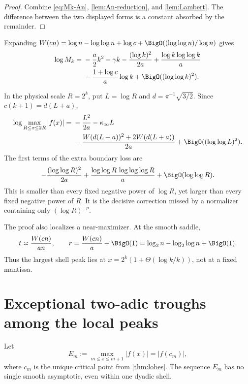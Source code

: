 \documentclass[11pt,oneside]{article}
\theoremstyle{definition}
\theoremstyle{remark}
\newcommand{\LambertW}{W}
\begin{document}
\begin{proof}
Combine \eqref{eq:Mk-An}, \cref{lem:An-reduction}, and
\cref{lem:Lambert}.  The difference between the two displayed forms is a
constant absorbed by the remainder.
\end{proof}

Expanding
$\LambertW(cn)=\log n-\log\log n+\log c+\BigO((\log\log n)/\log n)$ gives
\begin{align}
 \log M_k={}&-\frac a2k^2-\gamma k
 -\frac{(\log k)^2}{2a}
 +\frac{\log k\log\log k}{a}
 \notag\\
 &-\frac{1+\log c}{a}\log k
 +\BigO((\log\log k)^2).
 \label{eq:annular-expanded}
\end{align}

In the physical scale $R=2^k$, put $L=\log R$ and
$d=\pi^{-1}\sqrt{3/2}$.  Since $c(k+1)=d(L+a)$,
\begin{equation}
 \begin{split}
 \log\max_{R\le x\le2R}|f(x)|
 ={}&-\frac{L^2}{2a}-\kappa_\infty L\\
 &-\frac{\LambertW(d(L+a))^2+2\LambertW(d(L+a))}{2a}
 +\BigO((\log\log L)^2).
 \end{split}
 \label{eq:annular-R}
\end{equation}
The first terms of the extra boundary loss are
\begin{equation}
 -\frac{(\log\log R)^2}{2a}
 +\frac{\log\log R\,\log\log\log R}{a}
 +\BigO(\log\log R).
 \label{eq:second-lognormal}
\end{equation}
This is smaller than every fixed negative power of $\log R$, yet larger than
every fixed negative power of $R$.  It is the decisive correction missed by a
normalizer containing only $(\log R)^{-p}$.

The proof also localizes a near-maximizer.  At the smooth saddle,
\begin{equation}
 t\asymp\frac{\LambertW(cn)}{an},
 \qquad
 r=\frac{\LambertW(cn)}a+\BigO(1)
 =\log_2n-\log_2\log n+\BigO(1).
 \label{eq:max-location}
\end{equation}
Thus the largest shell peak lies at
$x=2^k(1+\Theta(\log k/k))$, not at a fixed mantissa.

\section{Exceptional two-adic troughs among the local peaks}
\label{sec:two-adic}

Let
\begin{equation}
 E_m:=\max_{m\le x\le m+1}|f(x)|=|f(c_m)|,
 \label{eq:Em}
\end{equation}
where $c_m$ is the unique critical point from \cref{thm:lobes}.  The sequence
$E_m$ has no single smooth asymptotic, even within one dyadic shell.
\end{document}
